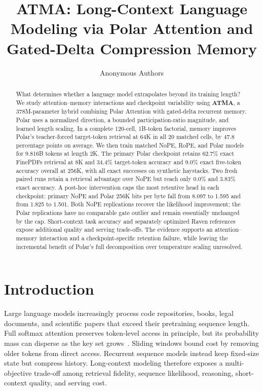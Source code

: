\documentclass{article}
\title{ATMA: Long-Context Language Modeling via Polar Attention and Gated-Delta Compression Memory}
\author{Anonymous Authors}
\begin{document}
\maketitle

\begin{abstract}
What determines whether a language model extrapolates beyond its training length? We study attention--memory interactions and checkpoint variability using \textbf{ATMA}, a 378M-parameter hybrid combining Polar Attention with gated-delta recurrent memory. Polar uses a normalized direction, a bounded participation-ratio magnitude, and learned length scaling. In a complete 120-cell, 1B-token factorial, memory improves Polar's teacher-forced target-token retrieval at 64K in all 20 matched cells, by 47.8 percentage points on average. We then train matched NoPE, RoPE, and Polar models for 9.816B tokens at length 2K. The primary Polar checkpoint retains 62.7\% exact FinePDFs retrieval at 8K and 34.4\% target-token accuracy and 9.0\% exact five-token accuracy overall at 256K, with all exact successes on synthetic haystacks. Two fresh paired runs retain a retrieval advantage over NoPE but reach only 0.0\% and 3.83\% exact accuracy. A post-hoc intervention caps the most retentive head in each checkpoint: primary NoPE and Polar 256K bits per byte fall from 8.097 to 1.595 and from 1.825 to 1.501. Both NoPE replications recover the likelihood improvement; the Polar replications have no comparable gate outlier and remain essentially unchanged by the cap. Short-context task accuracy and separately optimized Raven references expose additional quality and serving trade-offs. The evidence supports an attention--memory interaction and a checkpoint-specific retention failure, while leaving the incremental benefit of Polar's full decomposition over temperature scaling unresolved.
\end{abstract}

\section{Introduction}

Large language models increasingly process code repositories, books, legal documents, and scientific papers that exceed their pretraining sequence length. Full softmax attention preserves token-level access in principle, but its probability mass can disperse as the key set grows~\citep{nakanishi2025scalable,velickovic2025softmax,barbero2024glasses}. Sliding windows bound cost by removing older tokens from direct access. Recurrent sequence models instead keep fixed-size state but compress history. Long-context modeling therefore exposes a multi-objective trade-off among retrieval fidelity, sequence likelihood, reasoning, short-context quality, and serving cost.
\end{document}
